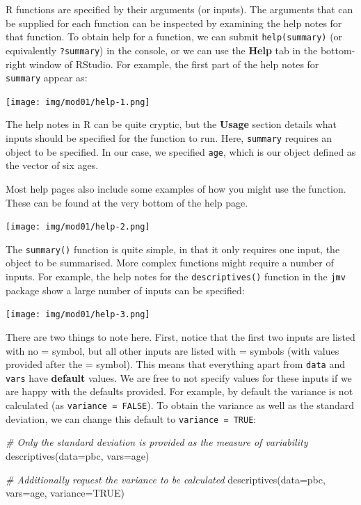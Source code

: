 \documentclass[
  a4paper,
]{memoir}
\newenvironment{Shaded}{\begin{snugshade}}{\end{snugshade}}
\newcommand{\AttributeTok}[1]{\textcolor[rgb]{0.00,0.00,0.00}{#1}}
\newcommand{\CommentTok}[1]{\textcolor[rgb]{0.00,0.00,0.00}{\textit{#1}}}
\newcommand{\ConstantTok}[1]{\textcolor[rgb]{0.00,0.00,0.00}{#1}}
\newcommand{\FunctionTok}[1]{\textcolor[rgb]{0.00,0.00,0.00}{#1}}
\newcommand{\NormalTok}[1]{\textcolor[rgb]{0.00,0.00,0.00}{#1}}
\begin{document}
R functions are specified by their arguments (or inputs). The arguments
that can be supplied for each function can be inspected by examining the
help notes for that function. To obtain help for a function, we can
submit \texttt{help(summary)} (or equivalently \texttt{?summary}) in the
console, or we can use the \textbf{Help} tab in the bottom-right window
of RStudio. For example, the first part of the help notes for
\texttt{summary} appear as:

\texttt{[image: img/mod01/help-1.png]}

The help notes in R can be quite cryptic, but the \textbf{Usage} section
details what inputs should be specified for the function to run. Here,
\texttt{summary} requires an object to be specified. In our case, we
specified \texttt{age}, which is our object defined as the vector of six
ages.

Most help pages also include some examples of how you might use the
function. These can be found at the very bottom of the help page.

\texttt{[image: img/mod01/help-2.png]}

The \texttt{summary()} function is quite simple, in that it only
requires one input, the object to be summarised. More complex functions
might require a number of inputs. For example, the help notes for the
\texttt{descriptives()} function in the \texttt{jmv} package show a
large number of inputs can be specified:

\texttt{[image: img/mod01/help-3.png]}

There are two things to note here. First, notice that the first two
inputs are listed with no = symbol, but all other inputs are listed with
= symbols (with values provided after the = symbol). This means that
everything apart from \texttt{data} and \texttt{vars} have
\textbf{default} values. We are free to not specify values for these
inputs if we are happy with the defaults provided. For example, by
default the variance is not calculated (as \texttt{variance\ =\ FALSE}).
To obtain the variance as well as the standard deviation, we can change
this default to \texttt{variance\ =\ TRUE}:

\begin{Shaded}
\begin{Highlighting}[]
\CommentTok{\# Only the standard deviation is provided as the measure of variability}
\FunctionTok{descriptives}\NormalTok{(}\AttributeTok{data=}\NormalTok{pbc, }\AttributeTok{vars=}\NormalTok{age)}

\CommentTok{\# Additionally request the variance to be calculated}
\FunctionTok{descriptives}\NormalTok{(}\AttributeTok{data=}\NormalTok{pbc, }\AttributeTok{vars=}\NormalTok{age, }\AttributeTok{variance=}\ConstantTok{TRUE}\NormalTok{)}
\end{Highlighting}
\end{Shaded}
\end{document}

